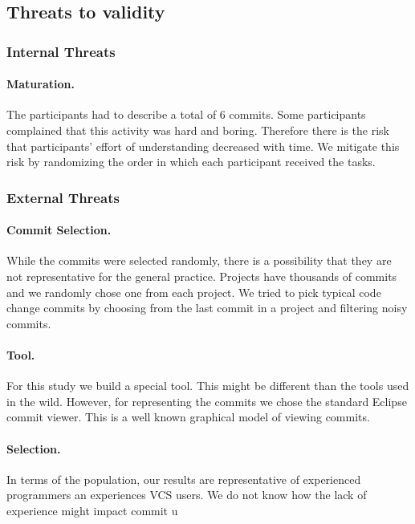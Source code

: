 \documentclass[letterpaper]{article}
\begin{document}
\subsection{Threats to validity}

\subsubsection{Internal Threats}

\paragraph{Maturation.}
The participants had to describe a total of 6 commits.
Some participants complained that this activity was hard and boring.
Therefore there is the risk that participants' effort of understanding decreased with time.
We mitigate this risk by randomizing the order in which each participant received the tasks.

\subsubsection{External Threats}

\paragraph{Commit Selection.}
While the commits were selected randomly, there is a possibility that they are not representative for the general practice.
Projects have thousands of commits and we randomly chose one from each project.
We tried to pick typical code change commits by choosing from the last commit in a project and filtering noisy commits.

\paragraph{Tool.}
For this study we build a special tool. 
This might be different than the tools used in the wild.
However, for representing the commits we chose the standard Eclipse commit viewer.
This is a well known graphical model of viewing commits.

\paragraph{Selection.}
In terms of the population, our results are representative of experienced programmers an experiences VCS users.
We do not know how the lack of experience might impact commit u
\end{document}
